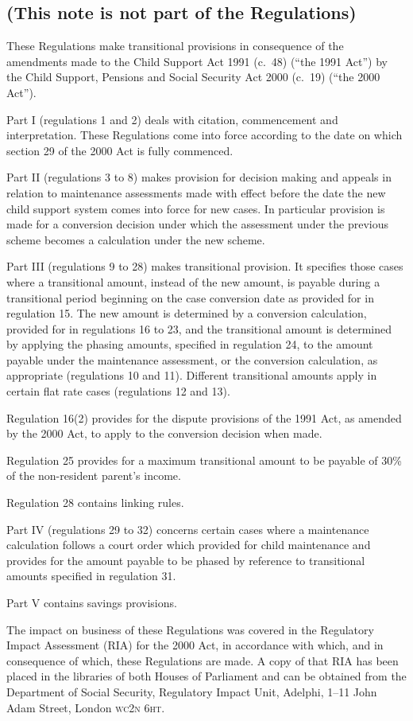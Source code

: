 \documentclass[12pt,a4paper]{article}
\begin{document}
\renewcommand\parthead{--- Explanatory Note}

\subsection*{(This note is not part of the Regulations)}

These Regulations make transitional provisions in consequence of the amendments made to the Child Support Act 1991 (c.\ 48) (“the 1991 Act”) by the Child Support, Pensions and Social Security Act 2000 (c.\ 19) (“the 2000 Act”).

Part I (regulations 1 and 2) deals with citation, commencement and interpretation. These Regulations come into force according to the date on which section 29 of the 2000 Act is fully commenced.

Part II (regulations 3 to 8) makes provision for decision making and appeals in relation to maintenance assessments made with effect before the date the new child support system comes into force for new cases. In particular provision is made for a conversion decision under which the assessment under the previous scheme becomes a calculation under the new scheme.

Part III (regulations 9 to 28) makes transitional provision. It specifies those cases where a transitional amount, instead of the new amount, is payable during a transitional period beginning on the case conversion date as provided for in regulation 15. The new amount is determined by a conversion calculation, provided for in regulations 16 to 23, and the transitional amount is determined by applying the phasing amounts, specified in regulation 24, to the amount payable under the maintenance assessment, or the conversion calculation, as appropriate (regulations 10 and 11). Different transitional amounts apply in certain flat rate cases (regulations 12 and 13).

Regulation 16(2) provides for the dispute provisions of the 1991 Act, as amended by the 2000 Act, to apply to the conversion decision when made.

Regulation 25 provides for a maximum transitional amount to be payable of 30\% of the non-resident parent’s income.

Regulation 28 contains linking rules.

Part IV (regulations 29 to 32) concerns certain cases where a maintenance calculation follows a court order which provided for child maintenance and provides for the amount payable to be phased by reference to transitional amounts specified in regulation 31.

Part V contains savings provisions.

The impact on business of these Regulations was covered in the Regulatory Impact Assessment (RIA) for the 2000 Act, in accordance with which, and in consequence of which, these Regulations are made. A copy of that RIA has been placed in the libraries of both Houses of Parliament and can be obtained from the Department of Social Security, Regulatory Impact Unit, Adelphi, 1--11 John Adam Street, London \textsc{\lowercase{WC2N 6HT}}. 
\end{document}
